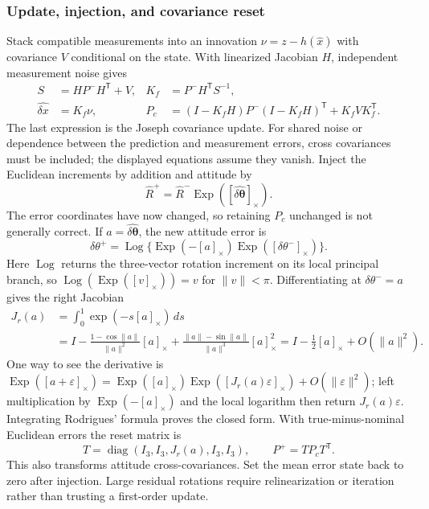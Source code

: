 \documentclass[11pt,a4paper]{article}
\numberwithin{equation}{section}
\begin{document}
\subsubsection{Update, injection, and covariance reset}

Stack compatible measurements into an innovation $\nu=z-h(\widehat x)$
with covariance $V$ conditional on the state. With linearized Jacobian
$H$, independent measurement noise gives
\begin{align}
 S&=HP^-H^{\mathsf T}+V,&K_f&=P^-H^{\mathsf T}S^{-1},\\
 \widehat{\delta x}&=K_f\nu,&
 P_c&=(I-K_fH)P^-(I-K_fH)^{\mathsf T}+K_fVK_f^{\mathsf T}.
\end{align}
The last expression is the Joseph covariance update. For shared noise
or dependence between the prediction and measurement errors, cross
covariances must be included; the displayed equations assume they vanish.
Inject the Euclidean increments by addition and attitude by
\begin{equation}
 \widehat R^+=\widehat R^-\operatorname{Exp}
                     ([\widehat{\delta\boldsymbol\theta}]_\times).
\end{equation}
The error coordinates have now changed, so retaining $P_c$ unchanged is
not generally correct. If $a=\widehat{\delta\boldsymbol\theta}$, the new
attitude error is
\begin{equation}
 \delta\theta^+=\operatorname{Log}\{\operatorname{Exp}(-[a]_\times)
                                \operatorname{Exp}([\delta\theta^-]_\times)\}.
\end{equation}
Here $\operatorname{Log}$ returns the three-vector rotation increment
on its local principal branch, so
$\operatorname{Log}(\operatorname{Exp}([v]_\times))=v$ for
$\|v\|<\pi$. Differentiating at $\delta\theta^-=a$ gives the right Jacobian
\begin{align}
 J_r(a)&=\int_0^1\exp(-s[a]_\times)\,ds\\
 &=I-\frac{1-\cos\|a\|}{\|a\|^2}[a]_\times
       +\frac{\|a\|-\sin\|a\|}{\|a\|^3}[a]_\times^2
   =I-\tfrac12[a]_\times+O(\|a\|^2).
\end{align}
One way to see the derivative is
$\operatorname{Exp}([a+\varepsilon]_\times)
=\operatorname{Exp}([a]_\times)\operatorname{Exp}([J_r(a)\varepsilon]_\times)
+O(\|\varepsilon\|^2)$; left multiplication by
$\operatorname{Exp}(-[a]_\times)$ and the local logarithm then return
$J_r(a)\varepsilon$. Integrating Rodrigues' formula proves the closed
form. With true-minus-nominal Euclidean errors the reset matrix is
\begin{equation}
 T=\operatorname{diag}(I_3,I_3,J_r(a),I_3,I_3),\qquad
 P^+=T P_cT^{\mathsf T}.
\end{equation}
This also transforms attitude cross-covariances. Set the mean error
state back to zero after injection. Large residual rotations require
relinearization or iteration rather than trusting a first-order update.
\end{document}
